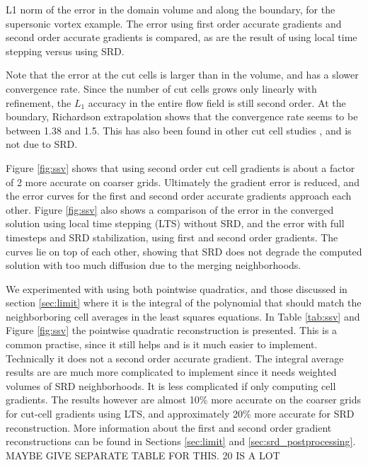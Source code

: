 {\begin{table}[h]
	\caption{\sf L1 norm of the error in the domain volume and along the boundary,
        for the supersonic vortex example. The error using first order accurate
        gradients and second order accurate gradients is compared, as are  the result
        of using local time stepping versus using SRD.\label{tab:ssv}}
\end{table}
}

Note that the error at the cut cells is larger than in the volume, and has a
slower convergence rate. Since the number of cut cells grows only
linearly with refinement, the $L_1$
accuracy in the entire flow field is still second order.  At the boundary,
Richardson extrapolation shows that the convergence rate seems to be
between 1.38 and 1.5.
This has also been found in other cut cell studies \cite{nemec_tm14}, and is not due to
SRD.

Figure \ref{fig:ssv} shows that using second order cut cell gradients is about
a factor of 2 more accurate on coarser grids. Ultimately the gradient
error is reduced, and the error curves for the first and second order 
accurate gradients approach each other. 
Figure \ref{fig:ssv} also shows a comparison of the error in the converged
solution using local time stepping (LTS)  without SRD, and the error with full timesteps and
SRD stabilization, using  first and second order gradients.
The curves lie on top of each other, showing that 
SRD does not degrade the computed solution with too much diffusion due
to the merging neighborhoods.

We experimented with using both pointwise quadratics, and those discussed in
section \ref{sec:limit} where it is the integral of the polynomial that should match the
neighborboring cell averages in the least squares equations. In Table \ref{tab:ssv}  and
Figure \ref{fig:ssv} the pointwise quadratic reconstruction is presented. 
This is a common practise, since it still helps and is it much easier to implement. 
Technically it does not a second order accurate gradient.
The integral average  results are are much more complicated to implement since 
it needs weighted volumes of SRD neighborhoods. It is less complicated if 
only computing cell gradients. The results however are almost 10\% more 
accurate on the coarser grids for cut-cell gradients using LTS, and approximately 
20\% more accurate for SRD reconstruction. 
More information about the first and second order gradient reconstructions can be found in Sections \ref{sec:limit} and \ref{sec:srd_postprocessing}.
MAYBE GIVE SEPARATE TABLE FOR THIS. 20  IS A LOT


